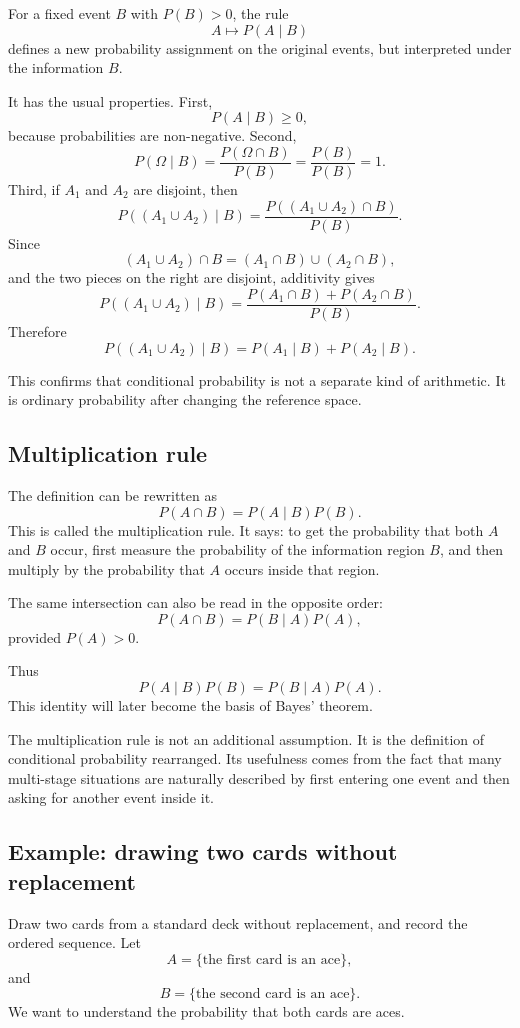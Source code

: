 For a fixed event \(B\) with \(P(B)>0\), the rule
\[
A\mapsto P(A\mid B)
\]
defines a new probability assignment on the original events, but interpreted
under the information \(B\).

It has the usual properties. First,
\[
P(A\mid B)\geq 0,
\]
because probabilities are non-negative. Second,
\[
P(\Omega\mid B)=\frac{P(\Omega\cap B)}{P(B)}=
\frac{P(B)}{P(B)}=1.
\]
Third, if \(A_1\) and \(A_2\) are disjoint, then
\[
P((A_1\cup A_2)\mid B)
=
\frac{P((A_1\cup A_2)\cap B)}{P(B)}.
\]
Since
\[
(A_1\cup A_2)\cap B=(A_1\cap B)\cup(A_2\cap B),
\]
and the two pieces on the right are disjoint, additivity gives
\[
P((A_1\cup A_2)\mid B)
=
\frac{P(A_1\cap B)+P(A_2\cap B)}{P(B)}.
\]
Therefore
\[
P((A_1\cup A_2)\mid B)=P(A_1\mid B)+P(A_2\mid B).
\]

This confirms that conditional probability is not a separate kind of arithmetic.
It is ordinary probability after changing the reference space.

\subsection*{Multiplication rule}

The definition can be rewritten as
\[
P(A\cap B)=P(A\mid B)P(B).
\]
This is called the multiplication rule. It says: to get the probability that
both \(A\) and \(B\) occur, first measure the probability of the information
region \(B\), and then multiply by the probability that \(A\) occurs inside that
region.

The same intersection can also be read in the opposite order:
\[
P(A\cap B)=P(B\mid A)P(A),
\]
provided \(P(A)>0\).

Thus
\[
P(A\mid B)P(B)=P(B\mid A)P(A).
\]
This identity will later become the basis of Bayes' theorem.

\begin{remarkbox}
The multiplication rule is not an additional assumption. It is the definition of
conditional probability rearranged. Its usefulness comes from the fact that many
multi-stage situations are naturally described by first entering one event and
then asking for another event inside it.
\end{remarkbox}

\subsection*{Example: drawing two cards without replacement}

Draw two cards from a standard deck without replacement, and record the ordered
sequence. Let
\[
A=\{\text{the first card is an ace}\},
\]
and
\[
B=\{\text{the second card is an ace}\}.
\]
We want to understand the probability that both cards are aces.

